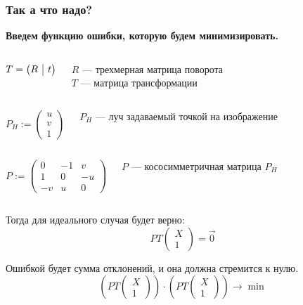 \documentclass{beamer}
\begin{document}

\begin{frame}
	\frametitle{Так а что надо?}
	\textbf{Введем функцию ошибки, которую будем минимизировать.}
	
	\begin{columns}[c]
		$T = \left(\begin{array}{@{}c|c@{}}
		R & t
		\end{array}\right)$
		
		$R$ --- трехмерная матрица поворота\\
		$T$ --- матрица трансформации
	\end{columns}
	
	\begin{columns}[c]
		$P_H := \begin{pmatrix} 
		u \\
		v \\
		1
		\end{pmatrix}$
		
		$P_H$ --- луч задаваемый точкой на изображение
	\end{columns}
	
	\begin{columns}[c]
		$P := \begin{pmatrix} 
		0 & -1 & v \\
		1 & 0 & -u \\
		-v & u & 0
		\end{pmatrix}$
		
		$P$ --- кососимметричная матрица $P_H$
	\end{columns}
	
	Тогда для идеального случая будет верно: 
	$$ P T 
	\begin{pmatrix} 
	X \\\hline
	1
	\end{pmatrix} = \vec{0} $$
	
	Ошибкой будет сумма отклонений, и она должна стремится к нулю.
	$$ (P T 
	\begin{pmatrix} 
	X \\\hline
	1
	\end{pmatrix})
	\cdot
	(P T 
	\begin{pmatrix} 
	X \\\hline
	1
	\end{pmatrix}) \rightarrow \min$$
\end{frame}
\end{document}
